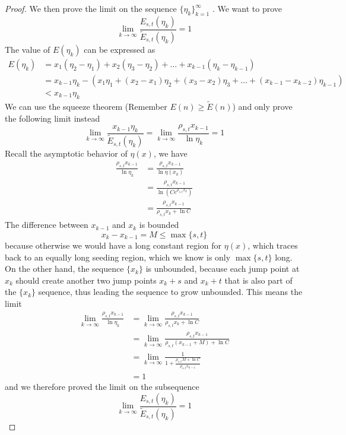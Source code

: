 \documentclass[]{article}
\begin{document}
\begin{proof}
	We then prove the limit on the sequence $\{\eta_k\}_{k=1}^{\infty}$ . We want to prove
	\[
	\lim_{k\to\infty}\frac{E_{s,t}(\eta_k)}{\tilde{E}_{s,t}(\eta_k)} = 1
	\]
	The value of $E(\eta_k)$ can be expressed as
	\begin{align*}
	E(\eta_k) &= x_1 (\eta_2 - \eta_1) + x_2 (\eta_3 - \eta_2) + \dots +x_{k-1} (\eta_k - \eta_{k-1})\\
	&=  x_{k-1}\eta_k - (x_1 \eta_1 + (x_2 - x_1) \eta_2 + (x_3 - x_2)\eta_3 + \dots + (x_{k-1} - x_{k-2}) \eta_{k-1}) \\
	&< x_{k-1}\eta_k
	\end{align*}
	We can use the squeeze theorem (Remember $E(n) \ge \tilde{E}(n)$) and only prove the following limit instead
	\[
	\lim_{k\to\infty}\frac{x_{k-1}\eta_k}{\tilde{E}_{s,t}(\eta_k)} = \lim_{k\to\infty}\frac{\rho_{s,t}x_{k-1}}{\ln\eta_k} = 1
	\]
	Recall the asymptotic behavior of $\eta(x)$, we have
	\begin{align*}
	\frac{\rho_{s,t}x_{k-1}}{\ln\eta_k} &= \frac{\rho_{s,t}x_{k-1}}{\ln\eta(x_k)} \\
	&=\frac{\rho_{s,t}x_{k-1}}{\ln\left(C e^{\rho_{s,t}x_k}\right)}\\
	&=\frac {\rho_{s,t}x_{k-1}}{\rho_{s,t}x_k +\ln C }
	\end{align*}
	The difference between $x_{k-1}$ and $x_k$ is bounded
	\[
	x_k - x_{k-1} = M \le \max\{s, t\}
	\]
	because otherwise we would have a long constant region for $\eta(x)$, which traces back to an equally long seeding region, which we know is only $\max\{s, t\}$ long. On the other hand, the sequence $\{x_k\}$ is unbounded, because each jump point at $x_k$ should create another two jump points $x_k+s$ and $x_k+t$ that is also part of the $\{x_k\}$ sequence, thus leading the sequence to grow unbounded. This means the limit
	\begin{align*}
	\lim_{k\to\infty}\frac{\rho_{s,t}x_{k-1}}{\ln\eta_k} &= \lim_{k\to\infty}\frac {\rho_{s,t}x_{k-1}}{\rho_{s,t}x_k +\ln C } \\
	&= \lim_{k\to\infty}\frac {\rho_{s,t}x_{k-1}}{\rho_{s,t}(x_{k-1} + M) +\ln C }\\
	&= \lim_{k\to\infty}\frac {1}{1 + \frac{\rho_{s,t}M +\ln C}{\rho_{s,t}x_{k-1}} } \\
	&=1
	\end{align*}
	and we therefore proved the limit on the subsequence
	\[
	\lim_{k\to\infty}\frac{E_{s,t}(\eta_k)}{\tilde{E}_{s,t}(\eta_k)} = 1
	\]


\end{proof}
\end{document}
